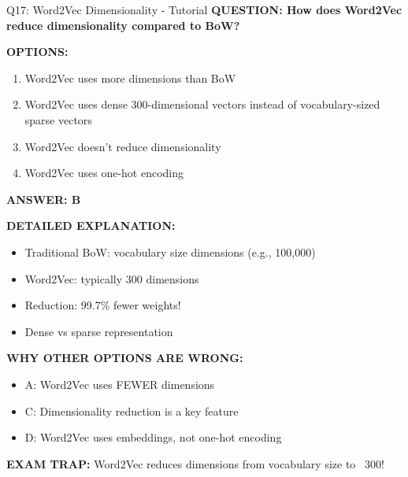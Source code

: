 \documentclass[8pt]{beamer}
\begin{document}
	\begin{frame}{Q17: Word2Vec Dimensionality - Tutorial}
		\fontsize{6.5}{7.5}\selectfont
		\textbf{QUESTION: How does Word2Vec reduce dimensionality compared to BoW?}
		
		\vspace{0.1cm}
		\textbf{OPTIONS:}
		\begin{enumerate}
			\item Word2Vec uses more dimensions than BoW
			\item Word2Vec uses dense 300-dimensional vectors instead of vocabulary-sized sparse vectors
			\item Word2Vec doesn't reduce dimensionality
			\item Word2Vec uses one-hot encoding
		\end{enumerate}
		
		\vspace{0.1cm}
		\textcolor{myblue}{\textbf{ANSWER: B}}
		
		\vspace{0.1cm}
		\textbf{DETAILED EXPLANATION:}
		\begin{itemize}
			\item Traditional BoW: vocabulary size dimensions (e.g., 100,000)
			\item Word2Vec: typically 300 dimensions
			\item Reduction: 99.7\% fewer weights!
			\item Dense vs sparse representation
		\end{itemize}
		
		\vspace{0.1cm}
		\textcolor{myred}{\textbf{WHY OTHER OPTIONS ARE WRONG:}}
		\begin{itemize}
			\item \textcolor{myred}{A:} Word2Vec uses FEWER dimensions
			\item \textcolor{myred}{C:} Dimensionality reduction is a key feature
			\item \textcolor{myred}{D:} Word2Vec uses embeddings, not one-hot encoding
		\end{itemize}
		
		\textcolor{myred}{\textbf{EXAM TRAP:}} Word2Vec reduces dimensions from \textcolor{myblue}{vocabulary size to ~300}!
	\end{frame}
	
\end{document}
